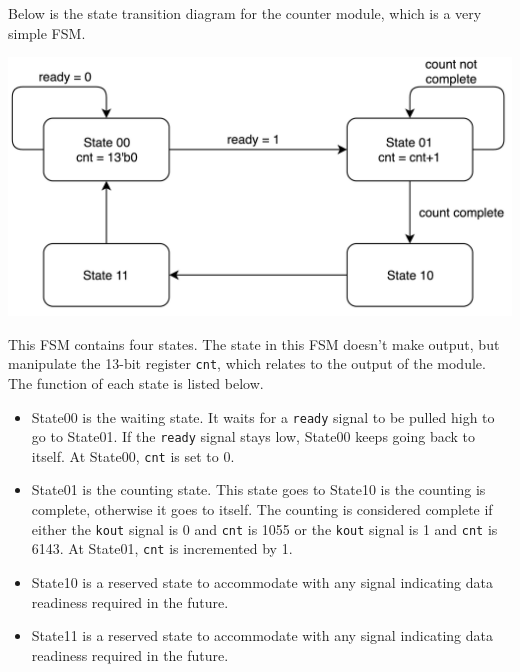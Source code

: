 \documentclass[letterpaper, 12pt]{article} %
\begin{document}
Below is the state transition diagram for the counter module, which is a very simple FSM.\\

\begin{center}
    \includegraphics[width=14cm, angle=0]{fsm_cheng.png}
\end{center}

This FSM contains four states. The state in this FSM doesn't make output, but manipulate the 13-bit register \texttt{cnt}, which relates to the output of the module. The function of each state is listed below.

\begin{itemize}
\item State00 is the waiting state. It waits for a \texttt{ready} signal to be pulled high to go to State01. If the \texttt{ready} signal stays low, State00 keeps going back to itself. At State00, \texttt{cnt} is set to 0. 
\item State01 is the counting state. This state goes to State10 is the counting is complete, otherwise it goes to itself. The counting is considered complete if either the \texttt{kout} signal is 0 and \texttt{cnt} is 1055 or the \texttt{kout} signal is 1 and \texttt{cnt} is 6143. At State01, \texttt{cnt} is incremented by 1. 

\item State10 is a reserved state to accommodate with any signal indicating data readiness required in the future. 


\item State11 is a reserved state to accommodate with any signal indicating data readiness required in the future. 
\end{itemize}
\end{document}
